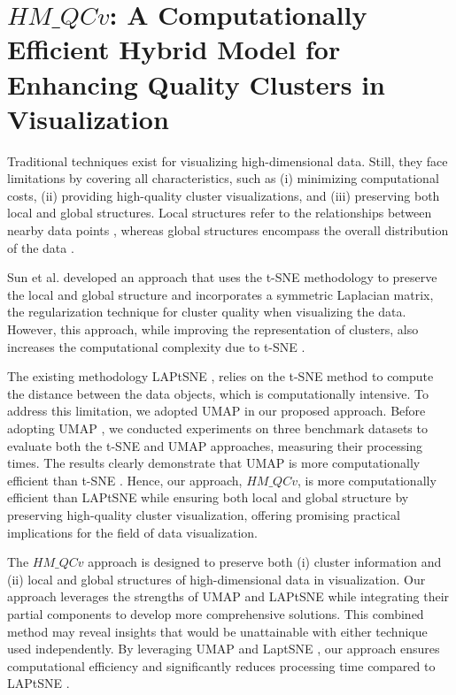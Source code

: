 \chapter{\Large \texorpdfstring{$HM\_QCv$}{HM\_QCv}: A Computationally Efficient Hybrid Model for Enhancing Quality Clusters in Visualization}



Traditional techniques \cite{tsne} \cite{umap_reference} \cite{sun2023laplacian} exist for visualizing high-dimensional data. Still, they face limitations by covering all characteristics, such as (i) minimizing computational costs, (ii) providing high-quality cluster visualizations, and (iii) preserving both local and global structures. Local structures refer to the relationships between nearby data points \cite{tsne}, whereas global structures encompass the overall distribution of the data \cite{umap_reference} \cite{tenenbaum2000global}.

Sun et al. \cite{sun2023laplacian} developed an approach that uses the t-SNE \cite{tsne} methodology to preserve the local and global structure and incorporates a symmetric Laplacian matrix, the regularization technique for cluster quality when visualizing the data. However, this approach, while improving the representation of clusters, also increases the computational complexity due to t-SNE \cite{tsne}.

The existing methodology LAPtSNE \cite{sun2023laplacian}, relies on the t-SNE \cite{tsne} method to compute the distance between the data objects, which is computationally intensive.  To address this limitation, we adopted UMAP \cite{umap_reference} in our proposed approach.  Before adopting UMAP \cite{umap_reference}, we conducted experiments on three benchmark datasets to evaluate both the t-SNE \cite{tsne} and UMAP \cite{umap_reference} approaches, measuring their processing times. The results clearly demonstrate that UMAP \cite{umap_reference} is more computationally efficient than t-SNE \cite{tsne}. Hence, our approach, $HM\_QCv$, is more computationally efficient than LAPtSNE \cite{sun2023laplacian} while ensuring both local and global structure by preserving high-quality cluster visualization, offering promising practical implications for the field of data visualization.


The $HM\_QCv$ approach is designed to preserve both (i) cluster information and (ii) local and global structures of high-dimensional data in visualization. Our approach leverages the strengths of UMAP \cite{umap_reference} and LAPtSNE \cite{sun2023laplacian} while integrating their partial components to develop more comprehensive solutions. This combined method may reveal insights that would be unattainable with either technique used independently. By leveraging UMAP \cite{umap_reference} and LaptSNE \cite{sun2023laplacian}, our approach ensures computational efficiency and significantly reduces processing time compared to LAPtSNE \cite{sun2023laplacian}.